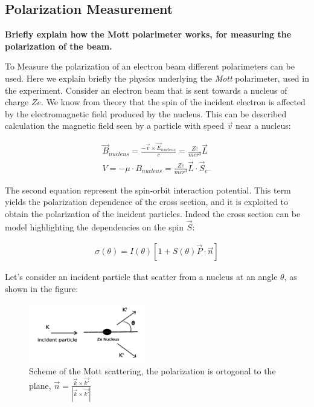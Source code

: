 \subsection{Polarization Measurement}
{\bfseries Briefly explain how the Mott polarimeter works, for measuring the polarization of the beam.}

To Measure the polarization of an electron beam different polarimeters can be used. Here we explain briefly the physics underlying the \textit{Mott} polarimeter, used in the experiment.
Consider an electron beam that is sent towards a nucleus of charge $Ze$. We know from theory that the spin of the incident electron is affected by the electromagnetic field produced by the nucleus. This can be described calculation the magnetic field seen by a particle with speed $\vec{v}$ near a nucleus:

\begin{align*}
\vec{B}_{nucleus} = \frac{-\vec{v} \times \vec{E}_{nucleus}}{c}  = \frac{Ze}{mc r^{3}} \vec{L} \\
V = - \mu \cdot B_{nucleus} = \frac{Ze}{mcr^{3}} \vec{L} \cdot \vec{S}_{e^{-}}
\end{align*}

The second equation represent the spin-orbit interaction potential. This term yields the polarization dependence of the cross section, and it is exploited to obtain the polarization of the incident particles. Indeed the cross section can be model highlighting the dependencies on the spin $\vec{S}$:

\begin{align*}
\sigma(\theta) = I(\theta) [1 + S(\theta) \vec{P} \cdot \vec{n} ]
\end{align*}

Let's consider an incident particle that scatter from a nucleus at an angle $\theta$, as shown in the figure:

\begin{figure}[hbtp]
\centering
\includegraphics[width = 0.45\textwidth]{ExperimentalSetup/mottFig.png}
\caption{Scheme of the Mott scattering, the polarization is ortogonal to the plane,  $ \vec{n} = \frac{\vec{k} \times \vec{k'}}{|\vec{k} \times \vec{k'}|}$}
\end{figure}


